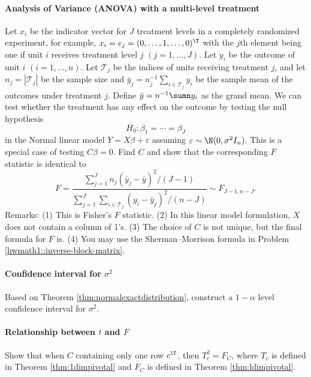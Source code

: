 \paragraph{Analysis of Variance (ANOVA) with a multi-level treatment}\label{hw5:anova-f}

Let $x_{i}$ be the indicator vector for $J$ treatment levels in
a completely randomized experiment, for example, $x_{i} = e_j=(0,\ldots,1,\ldots,0)^{\T} $
with the $j$th element being one if unit $i$ receives treatment
level $j$ $(j=1,\ldots,J)$. Let $y_{i}$ be the outcome of unit
$i$ $(i=1,\ldots,n)$. Let $\mathcal T_{j}$ be the indices of units receiving
treatment $j$, and let $n_{j}=|\mathcal T_{j}|$ be the sample size and $\bar{y}_{j} = n_j^{-1} \sum_{i\in \mathcal T_j} y_i$ be the sample
mean of the outcomes under treatment $j$. Define $\bar{y} = n^{-1} \sumn y_i$ as the grand mean. We can test whether the treatment
has any effect on the outcome by testing the null hypothesis 
\[
H_{0}:\beta_{1}=\cdots=\beta_{J}
\] 
in the Normal linear model $Y=X\beta+\varepsilon$ assuming $\varepsilon\sim \N(0,\sigma^{2} I_n ).$
This is a special case of testing $C\beta=0$. Find $C$ and show
that the corresponding $F$ statistic is identical to 
\[
F=\frac{\sum_{j=1}^{J}n_{j}(\bar{y}_{j}-\bar{y})^{2}/(J-1)}{\sum_{j=1}^{J}\sum_{i\in \mathcal T_{j}}(y_{i}-\bar{y}_{j})^{2}/(n-J)}\sim F_{J-1,n-J}.
\]
Remarks: (1)
This is Fisher's $F$ statistic. (2) In this linear model formulation, $X$ does not contain a column of 1's. (3) The choice of $C$ is not
unique, but the final formula for $F$ is. (4) You may use the Sherman--Morrison formula in Problem \ref{hwmath1::inverse-block-matrix}. 







 


\paragraph{Confidence interval for $\sigma^2$}\label{hw5::confidence-interval-sigma2}

Based on Theorem \ref{thm:normalexactdistribution}, construct a $1-\alpha$ level confidence interval for $\sigma^2$. 


\paragraph{Relationship between $t$ and $F$}\label{hw5::T-F-1dim}
Show that when $C$ containing only one row $c^{\T}$, then $T_c^2 = F_C$, where $T_c$ is defined in Theorem \ref{thm:1dimpivotal} and $F_C$ is defined in Theorem \ref{thm:ldimpivotal}. 


